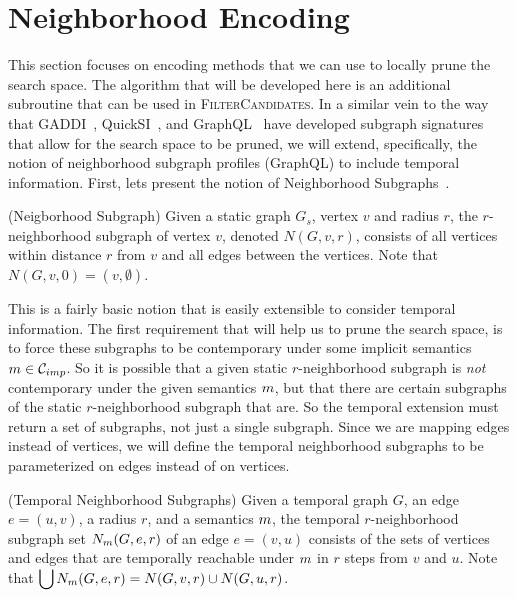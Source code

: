 \section{Neighborhood Encoding}
\label{sec:encoding}

This section focuses on encoding methods that we can use to locally prune the
search space. The algorithm that will be developed here is an additional
subroutine that can be used in \textsc{FilterCandidates}. In a similar vein to
the way that GADDI~\cite{2009-EDBT-GADDI}, QuickSI~\cite{2008-VLDB-QuickSI}, and
GraphQL~\cite{2008-SIGMOD-GraphQL} have developed subgraph signatures that allow
for the search space to be pruned, we will extend, specifically, the notion of
neighborhood subgraph profiles (GraphQL) to include temporal information. First,
lets present the notion of Neighborhood Subgraphs~\cite{2008-SIGMOD-GraphQL}.

\begin{defn}
  (Neigborhood Subgraph) Given a static graph $G_s$, vertex $v$ and radius $r$,
  the $r$-neighborhood subgraph of vertex $v$, denoted $N(G,v,r)$, consists of
  all vertices within distance $r$ from $v$ and all edges between the
  vertices. Note that $N(G,v,0) = ({v}, \emptyset)$.
\end{defn}

This is a fairly basic notion that is easily extensible to consider temporal
information. The first requirement that will help us to prune the search space,
is to force these subgraphs to be contemporary under some implicit semantics
$m \in \mathcal{C}_{imp}$. So it is possible that a given static $r$-neighborhood
subgraph is \emph{not} contemporary under the given semantics $m$, but
that there are certain subgraphs of the static $r$-neighborhood subgraph that
are.  So the temporal extension must return a set of subgraphs, not just a
single subgraph. Since we are mapping edges instead of vertices, we will define
the temporal neighborhood subgraphs to be parameterized on edges instead of on
vertices.

\begin{defn}
  (Temporal Neighborhood Subgraphs) Given a temporal graph $G$, an edge $e =
  (u,v)$, a radius $r$, and a semantics $m$, the temporal $r$-neighborhood
  subgraph set $N_{m}(G,e,r)$ of an edge $e = (v,u)$ consists of the sets
  of vertices and edges that are temporally reachable under $m$ in $r$
  steps from $v$ and $u$. Note that $\displaystyle\bigcup N_{m}(G,e,r) = N(G,v,r)
  \cup N(G,u,r)$.
\end{defn}

